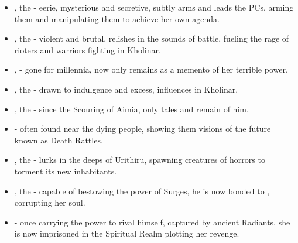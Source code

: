 \begin{itemize}
	\item \npcSjaAnat{}, the \npcSjaAnatTitle{} - eerie, mysterious and secretive, \npcSjaAnat{} subtly arms and leads the PCs, arming them and manipulating them to achieve her own agenda.
	
	\item \npcThrill, the \npcThrillTitle{} - violent and brutal, relishes in the sounds of battle, fueling the rage of rioters and warriors fighting in Kholinar.
	
	\item  \npcDustmother{}, \npcDustmotherTitle{} - gone for millennia, now only \lootDustcaster{} remains as a memento of her terrible power.
	
	\item \npcHeartRevel{}, the \npcHeartRevel{} - drawn to indulgence and excess, influences \npcFractionCult{} in Kholinar.
	
	\item \npcBlackFisher{}, the \npcBlackFisherTitle{} - since the Scouring of Aimia, only tales and \lootGateOpener{} remain of him.
	
	\item \npcMoelach{} - often found near the dying people, showing them visions of the future known as Death Rattles.
	
	\item \npcMidnightMother{}, the \npcMidnightMotherTitle{} - lurks in the deeps of Urithiru, spawning creatures of horrors to torment its new inhabitants.
	
	\item \npcYeligNar{}, the \npcYeligNarTitle{} - capable of bestowing the power of Surges, he is now bonded to \npcQueen{}, corrupting her soul.
	
	\item \npcMishram{} - once carrying the power to rival \npcOdium{} himself, captured by ancient Radiants, she is now imprisoned in the Spiritual Realm plotting her revenge.
\end{itemize}



